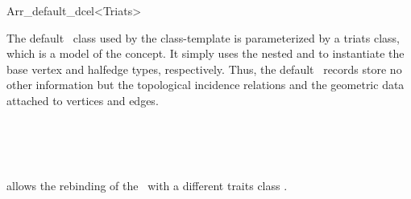 
\ccRefPageBegin

\begin{ccRefClass}{Arr_default_dcel<Triats>}

\ccDefinition

The default \dcel\ class used by the  class-template
is parameterized by a triats class, which is a model of the
 concept. It simply uses the nested
 and  to instantiate
the base vertex and halfedge types, respectively. Thus, the default \dcel\
records store no other information but the topological incidence relations
and the geometric data attached to vertices and edges.


\ccIsModel

\ccInheritsFrom
     \\
    ~~~~~~~~~~ \\
    ~~~~~~~~~~ \ccc{Arr_face_base>}

\ccTypes

   {allows the rebinding of the \dcel\ with a different traits class .}

\ccSeeAlso


\end{ccRefClass}

\ccRefPageEnd
